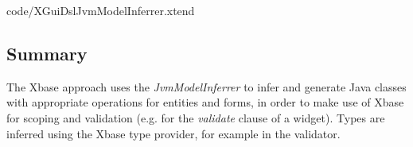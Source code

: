 	{code/XGuiDslJvmModelInferrer.xtend}

\subsection{Summary}
The Xbase approach uses the \emph{JvmModelInferrer} to infer and generate Java classes with appropriate operations for entities and forms, in order to make use of Xbase for scoping and validation (e.g. for the \emph{validate} clause of a widget). Types are inferred using the Xbase type provider, for example in the validator.
